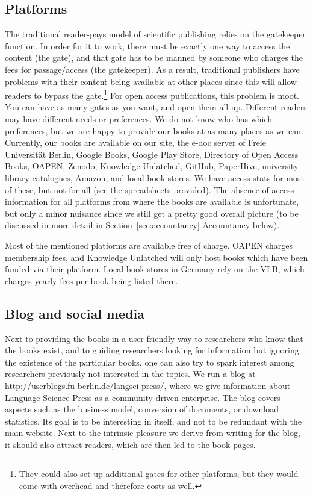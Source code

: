 \documentclass[guidelines,nonflat,modfonts] {langsci/langscibook}
\begin{document}
\subsection{Platforms}
The traditional reader-pays model of scientific publishing relies on the gatekeeper function. In order for it to work, there must be exactly one way to access the content (the gate), and that gate has to be manned by someone who charges the fees for passage\slash access (the gatekeeper). As a result, traditional publishers have problems with their content being available at other places since this will allow readers to bypass the gate.\footnote{They could also set up additional gates for other platforms, but they would come with overhead and therefore costs as well.} For open access publications, this problem is moot. You can have as many gates as you want, and open them all up. Different readers may have different needs or preferences. We do not know who has which preferences, but we are happy to provide our books at as many places as we can. Currently, our books are available on our site, the e-doc server of Freie Universität Berlin, Google Books, Google Play Store, Directory of Open Access Books, OAPEN, Zenodo, Knowledge Unlatched, GitHub, PaperHive, university library catalogues, Amazon, and local book stores. We have access stats for most of these, but not for all (see the spreadsheets provided). The absence of access information for all platforms from where the books are available is unfortunate, but only a minor nuisance since we still get a pretty good overall picture (to be discussed in more detail in Section~\ref{sec:accountancy} Accountancy below).

Most of the mentioned platforms are available free of charge. OAPEN charges membership fees, and Knowledge Unlatched will only host books which have been funded via their platform. Local book stores in Germany rely on the VLB, which charges yearly fees per book being listed there.

\subsection{Blog and social media}
Next to providing the books in a user-friendly way to researchers who know that the books exist, and to guiding researchers looking for information but ignoring the existence of the particular books, one can also try to spark interest among researchers previously not interested in the topics. We run a blog at \url{http://userblogs.fu-berlin.de/langsci-press/}, where we give information about Language Science Press as a community-driven enterprise. The blog covers aspects such as the business model, conversion of documents, or download statistics. Its goal is to be interesting in itself, and not to be redundant with the main website. Next to the intrinsic pleasure we derive from writing for the blog, it should also attract readers, which are then led to the book pages.  
\end{document}
